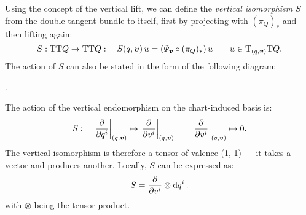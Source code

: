 Using the concept of the vertical lift, we can define the \emph{vertical isomorphism} \(S\) from the double tangent bundle to itself, first by projecting with \((\pi_Q)_*\) and then lifting again:
\begin{equation}
     S: \tbundle{\tbundle{Q}} \to \tbundle{\tbundle{Q}}: \quad S(q, \vec{v})\,u = \qty(\Psi_{\vec{v}} \circ (\pi_Q)_*)\,u \qquad u \in \tspace{(q, \vec{v})}{\tbundle{Q}}.
\end{equation}
The action of \(S\) can also be stated in the form of the following diagram:
\begin{center}
   .
\end{center}
The action of the vertical endomorphism on the chart-induced basis is:
\begin{equation}
     S: \quad \left. \pdv{}{q^i}\right|_{(q, \vec{v})} \mapsto \left.\pdv{}{v^i}\right|_{(q, \vec{v})} \qquad  \left. \pdv{}{v^i}\right|_{(q, \vec{v})} \mapsto 0.
\end{equation}
The vertical isomorphism is therefore a tensor of valence (1, 1) --- it takes a vector and produces another. Locally, \(S\) can be expressed as:
\begin{equation}
     S = \pdv{}{v^i}\otimes \dd{q^i}.
\end{equation}
with \(\otimes\) being the tensor product. \cite{Carinena1990}

